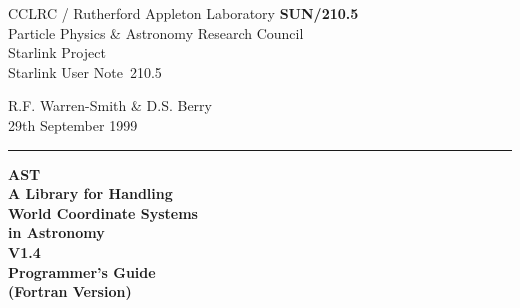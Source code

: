 \documentclass[twoside,11pt]{article}
\newcommand{\stardoccategory}  {Starlink User Note}
\newcommand{\stardocinitials}  {SUN}
\newcommand{\stardocnumber}    {210.5}
\newcommand{\stardocauthors}   {R.F. Warren-Smith \& D.S. Berry}
\newcommand{\stardocdate}      {29th September 1999}
\newcommand{\stardoctitle}     {AST\\
                                A Library for Handling\\
                                World Coordinate Systems\\
                                in Astronomy}
\newcommand{\stardocversion}   {V1.4}
\newcommand{\stardocmanual}    {Programmer's Guide\\(Fortran Version)}
\newcommand{\stardocname}{\stardocinitials /\stardocnumber}
\newenvironment{latexonly}{}{}
\begin{document}
\thispagestyle{empty}

\begin{latexonly}
   CCLRC / {\sc Rutherford Appleton Laboratory} \hfill {\bf \stardocname}\\
   {\large Particle Physics \& Astronomy Research Council}\\
   {\large Starlink Project\\}
   {\large \stardoccategory\ \stardocnumber}
   \begin{flushright}
   \stardocauthors\\
   \stardocdate
   \end{flushright}
   \vspace{-4mm}
   \rule{\textwidth}{0.5mm}
   \vspace{-7mm}
   \begin{center}
   {\Huge\bf  \stardoctitle \\ [2.0ex]}
   {\LARGE\bf \stardocversion \\ [1.0ex]}
   {\Huge\bf  \stardocmanual}
   \end{center}


\end{latexonly}
\end{document}
